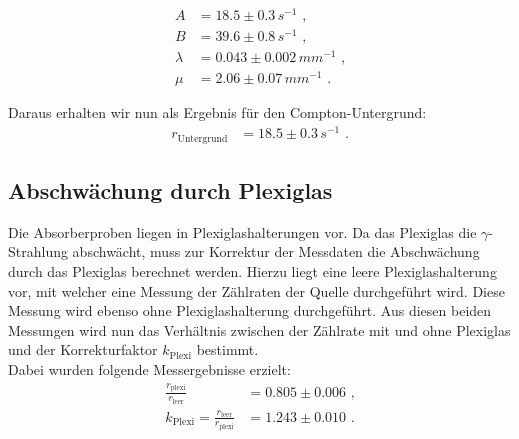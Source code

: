 \begin{align*}
		A&=18.5\pm0.3\,\si{s^{-1}}\text{ ,}\\
		B&=39.6\pm0.8\,\si{s^{-1}}\text{ ,}\\
		\lambda&=0.043\pm0.002\,\si{mm^{-1}}\text{ ,}\\
		\mu&=2.06\pm0.07\,\si{mm^{-1}}\text{ .}
\end{align*}

Daraus erhalten wir nun als Ergebnis für den Compton-Untergrund:
\begin{align}
	r_\text{Untergrund}&=18.5\pm0.3\,\si{s^{-1}}\text{ .}
\end{align}

\subsection{Abschwächung durch Plexiglas}

Die Absorberproben liegen in Plexiglashalterungen vor. Da das Plexiglas die $\gamma$-Strahlung abschwächt, muss zur Korrektur der Messdaten die Abschwächung durch das Plexiglas berechnet werden. Hierzu liegt eine leere Plexiglashalterung vor, mit welcher eine Messung der Zählraten der Quelle durchgeführt wird. Diese Messung wird ebenso ohne Plexiglashalterung durchgeführt. Aus diesen beiden Messungen wird nun das Verhältnis zwischen der Zählrate mit und ohne Plexiglas und der Korrekturfaktor $k_\text{Plexi}$ bestimmt.\\

Dabei wurden folgende Messergebnisse erzielt:
\begin{align}
	\frac{r_\text{plexi}}{r_\text{leer}}&=0.805\pm0.006\text{ ,}\\
	k_\text{Plexi}=\frac{r_\text{leer}}{r_\text{plexi}}&=1.243\pm0.010\text{ .}
\end{align}